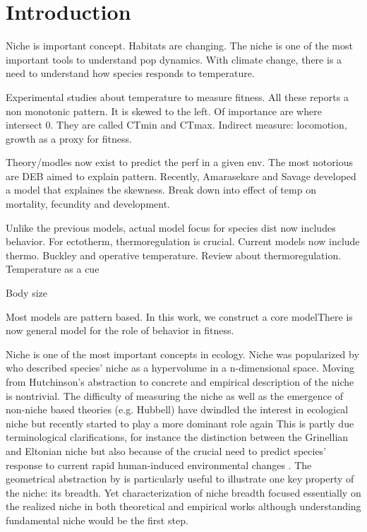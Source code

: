 \section*{Introduction}
Niche is important concept.
Habitats are changing. 
The niche is one of the most important tools to understand pop dynamics.
With climate change, there is a need to understand how species responds to temperature.

Experimental studies about temperature to measure fitness.
All these reports a non monotonic pattern.
It is skewed to the left.
Of importance are where intersect 0.
They are called CTmin and CTmax.
Indirect measure: locomotion, growth as a proxy for fitness.

Theory/modles now exist to predict the perf in a given env.
The most notorious are DEB aimed to explain pattern.
Recently, Amarasekare and Savage developed a model that explaines the skewness.
Break down into effect of temp on mortality,  fecundity and development.
 
Unlike the previous models, actual model focus for species dist now includes behavior.
For ectotherm, thermoregulation is crucial.
Current  models now include thermo.
Buckley and operative temperature.
Review about thermoregulation.
Temperature as a cue

Body size

Most models are pattern based.
In this work, we construct a core modelThere is now general model for the role of behavior in fitness.


 

Niche is one of the most important concepts in ecology.
Niche was popularized by \citet{Hutchinson1957} who described species' niche as a hypervolume in a n-dimensional space.
Moving from Hutchinson's abstraction to concrete and empirical description of the niche is nontrivial.
The difficulty of measuring the niche as well as the emergence of non-niche based theories  (e.g. Hubbell) have dwindled the interest in ecological niche but recently started to play a more dominant role again %
This is partly due terminological clarifications, for instance the distinction between the Grinellian and Eltonian niche \citep{Chase2003} but also because of the crucial need to predict species' response to current rapid human-induced environmental changes \citep[e.g.,][]{Parmesan2006, Kearney2009}. %
The geometrical abstraction by \citet{Hutchinson1957} is particularly useful to illustrate one key property of the niche: its breadth.
Yet  characterization of niche breadth focused essentially on the realized niche in both theoretical and empirical works although understanding fundamental niche would be the first step.


